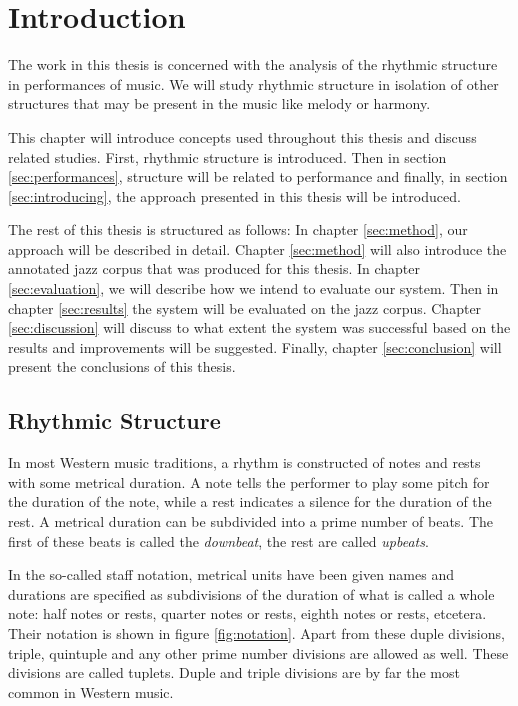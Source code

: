 \chapter{Introduction}
\label{sec:introduction}

The work in this thesis is concerned with the analysis of the rhythmic structure in performances of music. We will study rhythmic structure in isolation of other structures that may be present in the music like melody or harmony.

This chapter will introduce concepts used throughout this thesis and discuss related studies. First, rhythmic structure is introduced. Then in section \ref{sec:performances}, structure will be related to performance and finally, in section \ref{sec:introducing}, the approach presented in this thesis will be introduced.

The rest of this thesis is structured as follows: In chapter \ref{sec:method}, our approach will be described in detail. Chapter \ref{sec:method} will also introduce the annotated jazz corpus that was produced for this thesis. In chapter \ref{sec:evaluation}, we will describe how we intend to evaluate our system. Then in chapter \ref{sec:results} the system will be evaluated on the jazz corpus. Chapter \ref{sec:discussion} will discuss to what extent the system was successful based on the results and improvements will be suggested. Finally, chapter \ref{sec:conclusion} will present the conclusions of this thesis.

\section{Rhythmic Structure}
\label{sec:structure}

In most Western music traditions, a rhythm is constructed of notes and rests with some metrical duration. A note tells the performer to play some pitch for the duration of the note, while a rest indicates a silence for the duration of the rest. A metrical duration can be subdivided into a prime number of beats. The first of these beats is called the \textit{downbeat}, the rest are called \textit{upbeats}.

In the so-called staff notation, metrical units have been given names and durations are specified as subdivisions of the duration of what is called a whole note: half notes or rests, quarter notes or rests, eighth notes or rests, etcetera. Their notation is shown in figure \ref{fig:notation}. Apart from these duple divisions, triple, quintuple and any other prime number divisions are allowed as well. These divisions are called tuplets. Duple and triple divisions are by far the most common in Western music.

